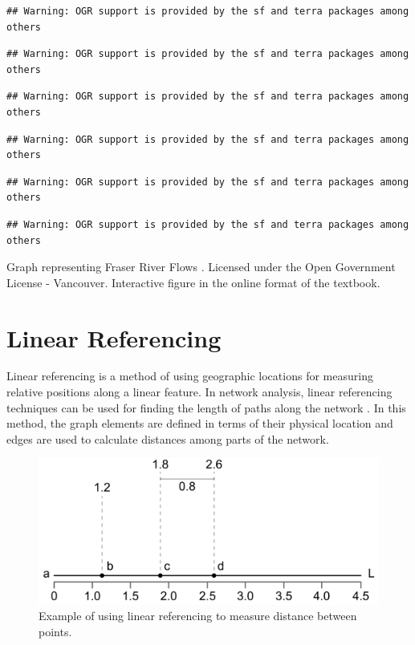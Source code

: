 \documentclass[
]{book}
\begin{document}
\begin{verbatim}
## Warning: OGR support is provided by the sf and terra packages among others
\end{verbatim}

\begin{verbatim}
## Warning: OGR support is provided by the sf and terra packages among others
\end{verbatim}

\begin{verbatim}
## Warning: OGR support is provided by the sf and terra packages among others
\end{verbatim}

\begin{verbatim}
## Warning: OGR support is provided by the sf and terra packages among others
\end{verbatim}

\begin{verbatim}
## Warning: OGR support is provided by the sf and terra packages among others
\end{verbatim}

\begin{verbatim}
## Warning: OGR support is provided by the sf and terra packages among others
\end{verbatim}

\label{fig:8-fraser-river-flows}Graph representing Fraser River Flows \citep{city_of_vancouver_open_nodate}. Licensed under the Open Government License - Vancouver. Interactive figure in the online format of the textbook.

\hypertarget{linear-referencing}{%
\section{Linear Referencing}\label{linear-referencing}}

Linear referencing is a method of using geographic locations for measuring relative positions along a linear feature. In network analysis, linear referencing techniques can be used for finding the length of paths along the network \citep{ramsey_23_2012}. In this method, the graph elements are defined in terms of their physical location and edges are used to calculate distances among parts of the network.

\begin{figure}
\includegraphics[width=0.8\linewidth]{images/08-linear_referencing} \caption{Example of using linear referencing to measure distance between points.}\label{fig:8-lienar-referencing}
\end{figure}
\end{document}
